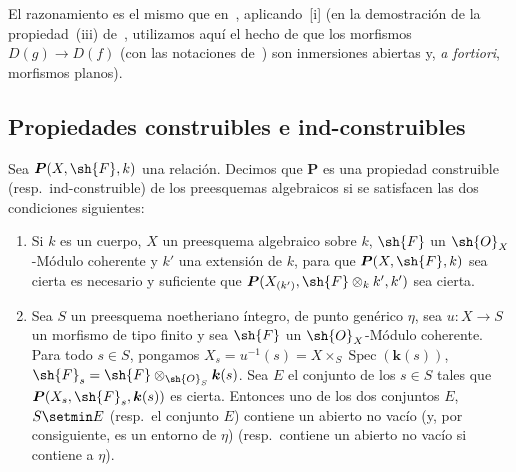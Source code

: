 El razonamiento es el mismo que en~, aplicando~[i] (en la demostración de la propiedad~(iii) de~, utilizamos aquí el hecho de que los morfismos $D(g)\to D(f)$ (con las notaciones de~) son inmersiones abiertas y, \emph{a fortiori}, morfismos planos).

\subsection{Propiedades construibles e ind-construibles}
\label{subsection:IV.9.2}
\label{IV.9.2}

\begin{definition}[9.2.1]
\label{IV.9.2.1}
Sea $\boldsymbol{P}(X,\sh{F},k)$ una relación.
Decimos que $\boldsymbol{P}$ es una propiedad construible (\textup{resp.}\ ind-construible) de los preesquemas algebraicos si se satisfacen las dos condiciones siguientes:
\begin{enumerate}[label=\textup{(\roman*)}]
  \item Si $k$ es un cuerpo, $X$ un preesquema algebraico sobre $k$, $\sh{F}$ un $\sh{O}_X$-Módulo coherente y $k'$ una extensión de $k$, para que $\boldsymbol{P}(X,\sh{F},k)$ sea cierta es necesario y suficiente que $\boldsymbol{P}(X_{(k')},\sh{F}\otimes_k k',k')$ sea cierta.
  \item Sea $S$ un preesquema noetheriano íntegro, de punto genérico $\eta$, sea $u:X\to S$ un morfismo de tipo finito y sea $\sh{F}$ un $\sh{O}_X$-Módulo coherente.
Para todo $s\in S$, pongamos $X_s=u^{-1}(s)=X\times_S\operatorname{Spec}(\boldsymbol{k}(s))$, $\sh{F}_s=\sh{F}\otimes_{\sh{O}_S}\boldsymbol{k}(s)$.
Sea $E$ el conjunto de los $s\in S$ tales que $\boldsymbol{P}(X_s,\sh{F}_s,\boldsymbol{k}(s))$ es cierta.
Entonces uno de los dos conjuntos $E$, $S\setmin E$ (\textup{resp.}\ el conjunto $E$) contiene un abierto no vacío \textup{(y, por consiguiente, es un entorno de $\eta$)} (\textup{resp.}\ contiene un abierto no vacío si contiene a $\eta$).
\end{enumerate}
\end{definition}



